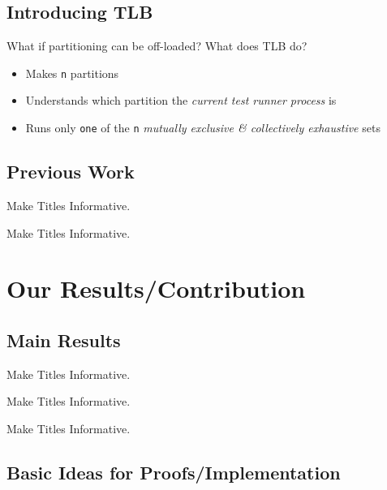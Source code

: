\documentclass{beamer}
\begin{document}
\subsection{Introducing TLB}

\begin{frame}{What if partitioning can be off-loaded?}
  What does TLB do?
  \begin{itemize}
  \item Makes \texttt{n} partitions
    \pause
  \item Understands which partition the \emph{current test runner process} is
    \pause
  \item Runs only \texttt{one} of the \texttt{n} \emph{mutually exclusive \& collectively exhaustive} sets
  \end{itemize}
\end{frame}


\subsection{Previous Work}

\begin{frame}{Make Titles Informative.}
\end{frame}

\begin{frame}{Make Titles Informative.}
\end{frame}



\section{Our Results/Contribution}

\subsection{Main Results}

\begin{frame}{Make Titles Informative.}
\end{frame}

\begin{frame}{Make Titles Informative.}
\end{frame}

\begin{frame}{Make Titles Informative.}
\end{frame}


\subsection{Basic Ideas for Proofs/Implementation}
\end{document}
